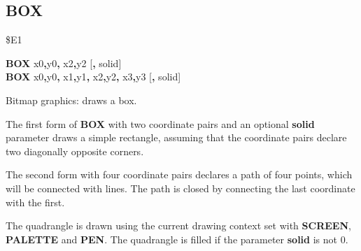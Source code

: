 \subsection{BOX}
\begin{description}[leftmargin=2cm,style=nextline]
\item [Token:] \$E1
\item [Format:] {\bf BOX} x0{\bf,}y0{\bf,} x2{\bf,}y2 [{\bf,} solid] \\
                {\bf BOX} x0{\bf,}y0{\bf,} x1{\bf,}y1{\bf,}
                x2{\bf,}y2{\bf,} x3{\bf,}y3 [{\bf,} solid]
\item [Usage:] Bitmap graphics: draws a box.

               The first form of {\bf BOX} with
               two coordinate pairs and an optional {\bf solid} parameter
               draws a simple rectangle, assuming that the
               coordinate pairs declare two diagonally opposite corners.

               The second form with four coordinate pairs declares a
               path of four points, which will be connected with lines.
               The path is closed by connecting the last coordinate with the
               first.

               The quadrangle is drawn using the current drawing context
               set with {\bf SCREEN}, {\bf PALETTE} and {\bf PEN}.
               The quadrangle is filled if the parameter {\bf solid}
               is not 0.


\end{description}
